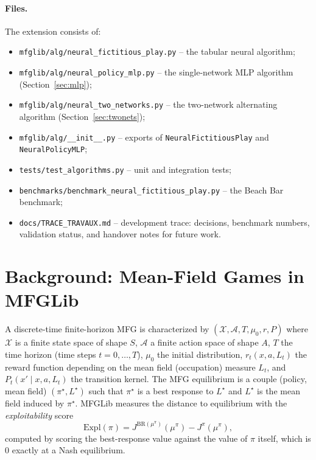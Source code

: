 \documentclass[11pt,a4paper]{article}
\begin{document}
\paragraph{Files.} The extension consists of:
\begin{itemize}
  \item \texttt{mfglib/alg/neural\_fictitious\_play.py} -- the tabular neural algorithm;
  \item \texttt{mfglib/alg/neural\_policy\_mlp.py} -- the single-network MLP algorithm (Section~\ref{sec:mlp});
  \item \texttt{mfglib/alg/neural\_two\_networks.py} -- the two-network alternating algorithm (Section~\ref{sec:twonets});
  \item \texttt{mfglib/alg/\_\_init\_\_.py} -- exports of \texttt{NeuralFictitiousPlay} and \texttt{NeuralPolicyMLP};
  \item \texttt{tests/test\_algorithms.py} -- unit and integration tests;
  \item \texttt{benchmarks/benchmark\_neural\_fictitious\_play.py} -- the Beach Bar benchmark;
  \item \texttt{docs/TRACE\_TRAVAUX.md} -- development trace: decisions, benchmark
        numbers, validation status, and handover notes for future work.
\end{itemize}

\section{Background: Mean-Field Games in MFGLib}

A discrete-time finite-horizon MFG is characterized by
$(\mathcal{X}, \mathcal{A}, T, \mu_0, r, P)$ where $\mathcal{X}$ is a finite state
space of shape $S$, $\mathcal{A}$ a finite action space of shape $A$, $T$ the time
horizon (time steps $t = 0, \dots, T$), $\mu_0$ the initial distribution,
$r_t(x, a, L_t)$ the reward function depending on the mean field (occupation)
measure $L_t$, and $P_t(x' \mid x, a, L_t)$ the transition kernel. The MFG
equilibrium is a couple (policy, mean field) $(\pi^\star, L^\star)$ such that
$\pi^\star$ is a best response to $L^\star$ and $L^\star$ is the mean field
induced by $\pi^\star$. MFGLib measures the distance to equilibrium with the
\emph{exploitability} score
\begin{equation}
  \mathrm{Expl}(\pi) = J^{\mathrm{BR}(\mu^\pi)}(\mu^\pi) - J^{\pi}(\mu^\pi),
\end{equation}
computed by scoring the best-response value against the value of $\pi$ itself,
which is $0$ exactly at a Nash equilibrium.
\end{document}
